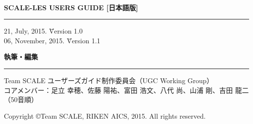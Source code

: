 \newpage
\thispagestyle{empty}

　\\

\vspace{10mm}
{\large{\bf SCALE-LES USERS GUIDE [日本語版]}}\\
\hrule width 90mm
\begin{tabbing} 
21, July, 2015.  \= \=  Version 1.0\\
06, November, 2015.  \= \=  Version 1.1
\end{tabbing} 


\vspace{10mm}
{\large{\bf 執筆・編集}}\\
\hrule width 90mm
\begin{tabbing} 
Team SCALE ユーザーズガイド制作委員会（UGC Working Group）\\
コアメンバー：足立 幸穂、佐藤 陽祐、富田 浩文、八代 尚、山浦 剛、吉田 龍二（50音順）\\
\end{tabbing} 


\vspace{110mm}
\begin{flushright}

\vspace{10mm}
Copyright \copyright Team SCALE, RIKEN AICS, 2015. All rights reserved.
\end{flushright}


